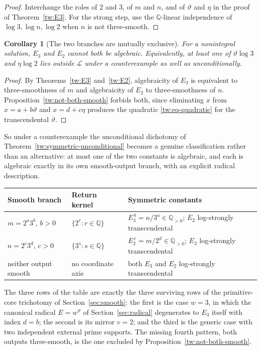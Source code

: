 \documentclass[11pt,oneside]{article}
\newtheorem{corollary}[theorem]{Corollary}
\theoremstyle{definition}
\theoremstyle{remark}
\newcommand{\Q}{\mathbb Q}
\newcommand{\thetaq}{\vartheta}
\newcommand{\LL}{\mathcal L}
\begin{document}
\begin{proof}
Interchange the roles of $2$ and $3$, of $m$ and $n$, and of $\thetaq$ and $\eta$ in the proof
of Theorem~\ref{tw:E3}.  For the strong step, use the $\Q$-linear independence of
$\log3,\log n,\log2$ when $n$ is not three-smooth.
\end{proof}

\begin{corollary}[The two branches are mutually exclusive]
\label{tw:not-both-algebraic}
For a nonintegral solution, $E_3$ and $E_2$ cannot both be algebraic.  Equivalently, at least
one of $\thetaq\log3$ and $\eta\log2$ lies outside $\LL$ under a counterexample as well as
unconditionally.
\end{corollary}

\begin{proof}
By Theorems~\ref{tw:E3} and~\ref{tw:E2}, algebraicity of $E_3$ is equivalent to
three-smoothness of $m$ and algebraicity of $E_2$ to three-smoothness of $n$.
Proposition~\ref{tw:not-both-smooth} forbids both, since eliminating $x$ from
$x=a+b\thetaq$ and $x=d+c\eta$ produces the quadratic \eqref{tw:eq-quadratic} for the
transcendental $\thetaq$.
\end{proof}

So under a counterexample the unconditional dichotomy of
Theorem~\ref{tw:symmetric-unconditional} becomes a genuine classification rather than an
alternative: at most one of the two constants is algebraic, and each is algebraic exactly in
its own smooth-output branch, with an explicit radical description.

\begin{center}
\begin{tabular}{@{}p{}p{}p{}@{}}
\toprule
Smooth branch & Return kernel & Symmetric constants\\
\midrule
$m=2^a3^b$, $b>0$ & $\{2^r:r\in\Q\}$ &
$E_3^{\,b}=n/3^a\in\Q_{>0}$; $E_2$ log-strongly transcendental\\
$n=2^c3^d$, $c>0$ & $\{3^s:s\in\Q\}$ &
$E_2^{\,c}=m/2^d\in\Q_{>0}$; $E_3$ log-strongly transcendental\\
neither output smooth & no coordinate axis &
both $E_3$ and $E_2$ log-strongly transcendental\\
\bottomrule
\end{tabular}
\end{center}

The three rows of the table are exactly the three surviving rows of the primitive-core
trichotomy of Section~\ref{sec:smooth}: the first is the case $w=3$, in which the canonical
radical $E=w^{\thetaq}$ of Section~\ref{sec:radical} degenerates to $E_3$ itself with index
$d=b$; the second is its mirror $v=2$; and the third is the generic case with two independent
external prime supports.  The missing fourth pattern, both outputs three-smooth, is the one
excluded by Proposition~\ref{tw:not-both-smooth}.
\end{document}
